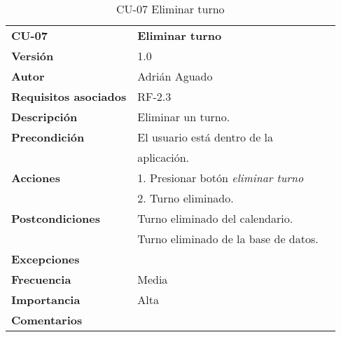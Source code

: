 \begin{table}
\begin{tabular}{llr}  
\toprule
\begin{minipage}[b]{0.24\columnwidth}\raggedright\strut
\textbf{CU-07}\strut
\end{minipage} & \begin{minipage}[b]{0.72\columnwidth}\raggedright\strut
\textbf{Eliminar turno}\strut
\end{minipage}\tabularnewline
\cmidrule(r){1-2}
\textbf{Versión}       & 1.0           \\
\textbf{Autor}       & Adrián  Aguado    \\
\textbf{Requisitos asociados}       & RF-2.3 \\ 
\textbf{Descripción} & Eliminar un turno.\\
\textbf{Precondición} & El usuario está dentro de la \\
& aplicación.       \\
\textbf{Acciones} & 1. Presionar botón \emph{eliminar turno} \\
& 2. Turno eliminado. \\
\textbf{Postcondiciones} & Turno eliminado del calendario.\\
& Turno eliminado de la base de datos. \\
\textbf{Excepciones} &     \\
\textbf{Frecuencia} & Media          \\
\textbf{Importancia} & Alta            \\
\textbf{Comentarios } &      \\
\bottomrule
\end{tabular}
\caption{CU-07 Eliminar turno} 
\end{table}

